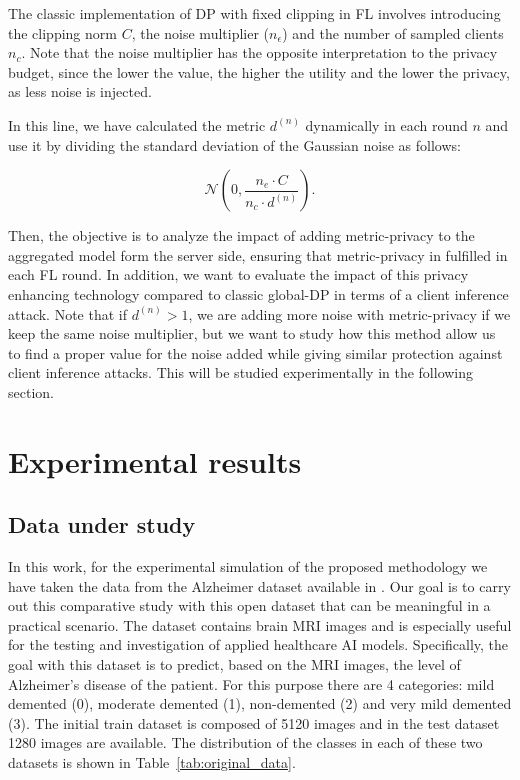 \documentclass[5p,times]{elsarticle}
\begin{document}
The classic implementation of DP with fixed clipping in FL involves introducing the clipping norm $C$, the noise multiplier ($n_{\epsilon}$) and the number of sampled clients $n_{c}$. Note that the noise multiplier has the opposite interpretation to the privacy budget, since the lower the value, the higher the utility and the lower the privacy, as less noise is injected. %

In this line, we have calculated the metric $d^{(n)}$ dynamically in each round $n$ and use it by dividing the standard deviation of the Gaussian noise as follows:

$$
\mathcal{N}\left(0,\frac{n_{e}\cdot C}{n_{c} \cdot d^{(n)}}\right).
$$

Then, the objective is to analyze the impact of adding metric-privacy to the aggregated model form the server side, ensuring that metric-privacy in fulfilled in each FL round. In addition, we want to evaluate the impact of this privacy enhancing technology compared to classic global-DP in terms of a client inference attack. Note that if $d^{(n)}>1$, we are adding more noise with metric-privacy if we keep the same noise multiplier, but we want to study how this method allow us to find a proper value for the noise added while giving similar protection against client inference attacks. This will be studied experimentally in the following section.

\section{Experimental results}\label{sec:experiments}

\subsection{Data under study}\label{sec:data}

In this work, for the experimental simulation of the proposed methodology  we have taken the data from the Alzheimer dataset available in \cite{alzheimer_mri_dataset}. Our goal is to carry out this comparative study with this open dataset that can be meaningful in a practical scenario. The dataset contains brain MRI images and is especially useful for the testing and investigation of applied healthcare AI models. Specifically, the goal with this dataset is to predict, based on the MRI images, the level of Alzheimer's disease of the patient. For this purpose there are 4 categories: mild demented (0), moderate demented (1), non-demented (2) and very mild demented (3). The initial train dataset is composed of 5120 images and in the test dataset 1280 images are available. The distribution of the classes in each of these two datasets is shown in Table~\ref{tab:original_data}. 
\end{document}
